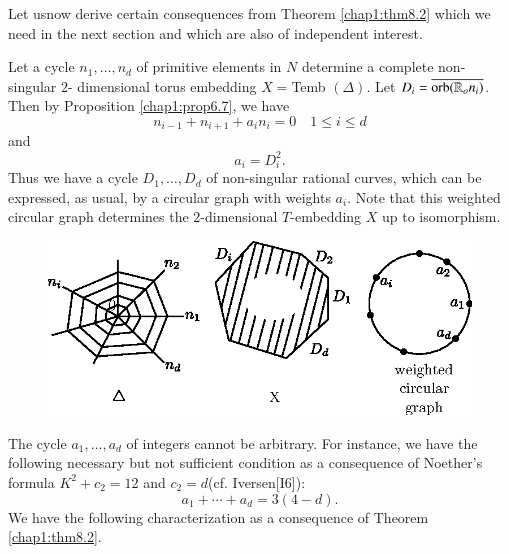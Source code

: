 Let us\pageoriginale now derive certain consequences from Theorem
\ref{chap1:thm8.2} which we need in the next section and which are also of
independent interest.  

Let a cycle  $n_1, \ldots , n_d$ of primitive elements in $N$
determine a complete non-singular $2$- dimensional torus embedding $X
= $Temb $(\Delta)$. Let $D_i = \overline{\operatorname{orb} (\mathbb{R}_o n_i)}$. Then by
Proposition \ref{chap1:prop6.7}, we have   
$$
n_{i-1} +n_{i+1} + a_i n_i = 0 \quad 1 \leq i \leq d 
$$
and 
$$
a_i = D^2_i.
$$
Thus we have a cycle $D_1, \ldots , D_d$ of non-singular rational
curves, which can be expressed, as usual, by a circular graph with
weights  $a_i$. Note that this weighted circular graph determines the
2-dimensional $T$-embedding $X$ up to isomorphism. 
\begin{figure}[H]
\centering 
\includegraphics{vol58-fig/fig58-18.eps} 
\end{figure}


The cycle $a_1, \ldots , a_d$ of integers cannot be arbitrary. For
instance, we have the following necessary but not sufficient condition
as a consequence of Noether's formula $K^2 + c_2 = 12$ and  $c_2
=d$\pageoriginale (cf. Iversen[I6]):   
$$
a_1 + \cdots + a_d = 3 (4-d).
$$
We have the following characterization as a consequence of Theorem
\ref{chap1:thm8.2}. 

